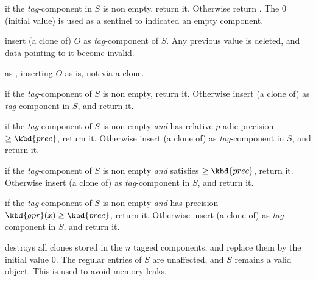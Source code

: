  if the \emph{tag}-component in $S$
is non empty, return it. Otherwise return . The  $0$
(initial value) is used as a sentinel to indicated an empty component.

 insert (a clone of) $O$
as \emph{tag}-component of $S$. Any previous value is deleted, and
data pointing to it become invalid.

 as ,
inserting $O$ as-is, not via a clone.

 if the
\emph{tag}-component of $S$ is non empty, return it. Otherwise insert
(a clone of)  as \emph{tag}-component in $S$, and return it.

if the \emph{tag}-component of $S$ is non empty \emph{and} has relative
$p$-adic precision $\geq \kbd{prec}$, return it. Otherwise insert (a clone
of)  as \emph{tag}-component in $S$, and return it.

 if the \emph{tag}-component of $S$ is non empty \emph{and}
satisfies  $\geq \kbd{prec}$, return it. Otherwise insert (a
clone of)  as \emph{tag}-component in $S$, and return it.

 if the \emph{tag}-component of $S$ is non empty
\emph{and} has precision $\kbd{gpr}(x)\geq \kbd{prec}$, return it. Otherwise
insert (a clone of)  as \emph{tag}-component in $S$,
and return it.

 destroys all clones stored in the $n$ tagged
components, and replace them by the initial value $0$. The regular entries of
$S$ are unaffected, and $S$ remains a valid object. This is used to
avoid memory leaks.
